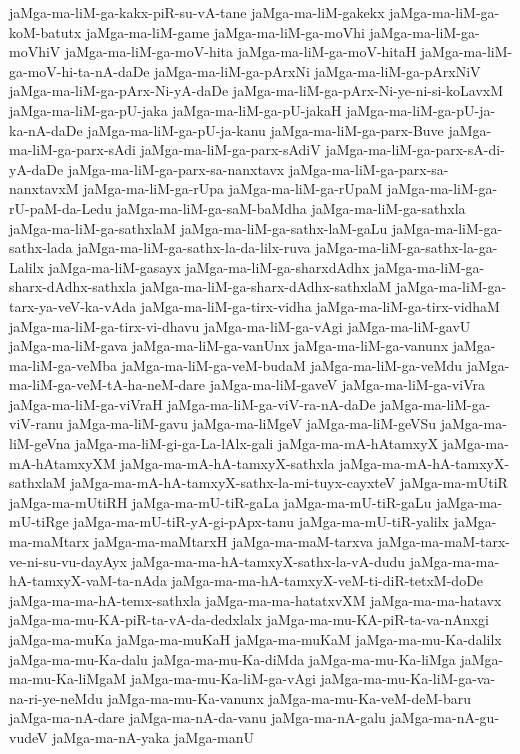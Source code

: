 {jaMga-ma-liM-ga-kakx-piR-su-vA-tane
jaMga-ma-liM-gakekx
jaMga-ma-liM-ga-koM-batutx
jaMga-ma-liM-game
jaMga-ma-liM-ga-moVhi
jaMga-ma-liM-ga-moVhiV
jaMga-ma-liM-ga-moV-hita
jaMga-ma-liM-ga-moV-hitaH
jaMga-ma-liM-ga-moV-hi-ta-nA-daDe
jaMga-ma-liM-ga-pArxNi
jaMga-ma-liM-ga-pArxNiV
jaMga-ma-liM-ga-pArx-Ni-yA-daDe
jaMga-ma-liM-ga-pArx-Ni-ye-ni-si-koLavxM
jaMga-ma-liM-ga-pU-jaka
jaMga-ma-liM-ga-pU-jakaH
jaMga-ma-liM-ga-pU-ja-ka-nA-daDe
jaMga-ma-liM-ga-pU-ja-kanu
jaMga-ma-liM-ga-parx-Buve
jaMga-ma-liM-ga-parx-sAdi
jaMga-ma-liM-ga-parx-sAdiV
jaMga-ma-liM-ga-parx-sA-di-yA-daDe
jaMga-ma-liM-ga-parx-sa-nanxtavx
jaMga-ma-liM-ga-parx-sa-nanxtavxM
jaMga-ma-liM-ga-rUpa
jaMga-ma-liM-ga-rUpaM
jaMga-ma-liM-ga-rU-paM-da-Ledu
jaMga-ma-liM-ga-saM-baMdha
jaMga-ma-liM-ga-sathxla
jaMga-ma-liM-ga-sathxlaM
jaMga-ma-liM-ga-sathx-laM-gaLu
jaMga-ma-liM-ga-sathx-lada
jaMga-ma-liM-ga-sathx-la-da-lilx-ruva
jaMga-ma-liM-ga-sathx-la-ga-Lalilx
jaMga-ma-liM-gasayx
jaMga-ma-liM-ga-sharxdAdhx
jaMga-ma-liM-ga-sharx-dAdhx-sathxla
jaMga-ma-liM-ga-sharx-dAdhx-sathxlaM
jaMga-ma-liM-ga-tarx-ya-veV-ka-vAda
jaMga-ma-liM-ga-tirx-vidha
jaMga-ma-liM-ga-tirx-vidhaM
jaMga-ma-liM-ga-tirx-vi-dhavu
jaMga-ma-liM-ga-vAgi
jaMga-ma-liM-gavU
jaMga-ma-liM-gava
jaMga-ma-liM-ga-vanUnx
jaMga-ma-liM-ga-vanunx
jaMga-ma-liM-ga-veMba
jaMga-ma-liM-ga-veM-budaM
jaMga-ma-liM-ga-veMdu
jaMga-ma-liM-ga-veM-tA-ha-neM-dare
jaMga-ma-liM-gaveV
jaMga-ma-liM-ga-viVra
jaMga-ma-liM-ga-viVraH
jaMga-ma-liM-ga-viV-ra-nA-daDe
jaMga-ma-liM-ga-viV-ranu
jaMga-ma-liM-gavu
jaMga-ma-liMgeV
jaMga-ma-liM-geVSu
jaMga-ma-liM-geVna
jaMga-ma-liM-gi-ga-La-lAlx-gali
jaMga-ma-mA-hAtamxyX
jaMga-ma-mA-hAtamxyXM
jaMga-ma-mA-hA-tamxyX-sathxla
jaMga-ma-mA-hA-tamxyX-sathxlaM
jaMga-ma-mA-hA-tamxyX-sathx-la-mi-tuyx-cayxteV
jaMga-ma-mUtiR
jaMga-ma-mUtiRH
jaMga-ma-mU-tiR-gaLa
jaMga-ma-mU-tiR-gaLu
jaMga-ma-mU-tiRge
jaMga-ma-mU-tiR-yA-gi-pApx-tanu
jaMga-ma-mU-tiR-yalilx
jaMga-ma-maMtarx
jaMga-ma-maMtarxH
jaMga-ma-maM-tarxva
jaMga-ma-maM-tarx-ve-ni-su-vu-dayAyx
jaMga-ma-ma-hA-tamxyX-sathx-la-vA-dudu
jaMga-ma-ma-hA-tamxyX-vaM-ta-nAda
jaMga-ma-ma-hA-tamxyX-veM-ti-diR-tetxM-doDe
jaMga-ma-ma-hA-temx-sathxla
jaMga-ma-ma-hatatxvXM
jaMga-ma-ma-hatavx
jaMga-ma-mu-KA-piR-ta-vA-da-dedxlalx
jaMga-ma-mu-KA-piR-ta-va-nAnxgi
jaMga-ma-muKa
jaMga-ma-muKaH
jaMga-ma-muKaM
jaMga-ma-mu-Ka-dalilx
jaMga-ma-mu-Ka-dalu
jaMga-ma-mu-Ka-diMda
jaMga-ma-mu-Ka-liMga
jaMga-ma-mu-Ka-liMgaM
jaMga-ma-mu-Ka-liM-ga-vAgi
jaMga-ma-mu-Ka-liM-ga-va-na-ri-ye-neMdu
jaMga-ma-mu-Ka-vanunx
jaMga-ma-mu-Ka-veM-deM-baru
jaMga-ma-nA-dare
jaMga-ma-nA-da-vanu
jaMga-ma-nA-galu
jaMga-ma-nA-gu-vudeV
jaMga-ma-nA-yaka
jaMga-manU
}
